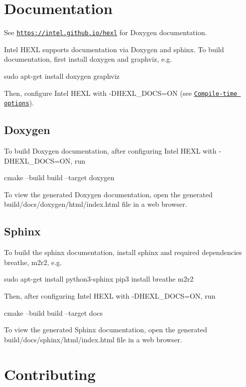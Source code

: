 \section*{Documentation}

See \href{https://intel.github.io/hexl}{\tt https\+://intel.\+github.\+io/hexl} for Doxygen documentation.

Intel H\+E\+XL supports documentation via Doxygen and sphinx. To build documentation, first install {\ttfamily doxygen} and {\ttfamily graphviz}, e.\+g. 
\begin{DoxyCode}
sudo apt-get install doxygen graphviz
\end{DoxyCode}
 Then, configure Intel H\+E\+XL with {\ttfamily -\/\+D\+H\+E\+X\+L\+\_\+\+D\+O\+CS=ON} (see \href{#compile-time-options}{\tt Compile-\/time options}). \subsection*{Doxygen}

To build Doxygen documentation, after configuring Intel H\+E\+XL with {\ttfamily -\/\+D\+H\+E\+X\+L\+\_\+\+D\+O\+CS=ON}, run 
\begin{DoxyCode}
cmake --build build --target doxygen
\end{DoxyCode}
 To view the generated Doxygen documentation, open the generated {\ttfamily build/docs/doxygen/html/index.\+html} file in a web browser.

\subsection*{Sphinx}

To build the sphinx documentation, install {\ttfamily sphinx} and required dependencies {\ttfamily breathe, m2r2}, e.\+g. 
\begin{DoxyCode}
sudo apt-get install python3-sphinx
pip3 install breathe m2r2
\end{DoxyCode}


Then, after configuring Intel H\+E\+XL with {\ttfamily -\/\+D\+H\+E\+X\+L\+\_\+\+D\+O\+CS=ON}, run 
\begin{DoxyCode}
cmake --build build --target docs
\end{DoxyCode}
 To view the generated Sphinx documentation, open the generated {\ttfamily build/docs/sphinx/html/index.\+html} file in a web browser.

\section*{Contributing}


